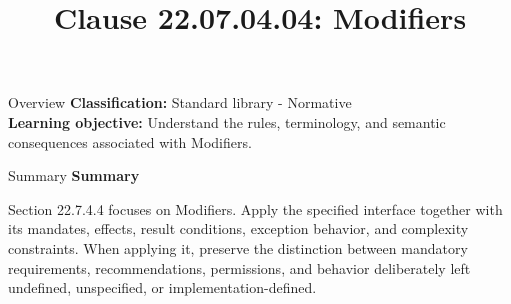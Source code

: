 \documentclass[10pt,letterpaper]{article}
\title{Clause 22.07.04.04: Modifiers}
\author{}
\date{}
\begin{document}
\maketitle
\begin{CornellOverviewBox}{Overview}
\textbf{Classification:} Standard library - Normative\\[2pt]
\textbf{Learning objective:} Understand the rules, terminology, and semantic consequences associated with Modifiers.
\end{CornellOverviewBox}\begin{CornellSummaryBox}{Summary}
{\sffamily\bfseries\color{Accent} Summary}\par\vspace{3pt}Section 22.7.4.4 focuses on Modifiers. Apply the specified interface together with its mandates, effects, result conditions, exception behavior, and complexity constraints. When applying it, preserve the distinction between mandatory requirements, recommendations, permissions, and behavior deliberately left undefined, unspecified, or implementation-defined.
\end{CornellSummaryBox}
\end{document}

